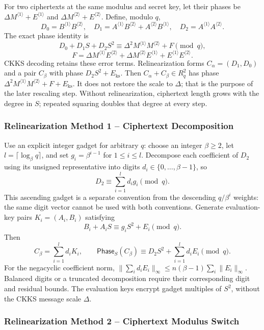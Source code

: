 For two ciphertexts at the same modulus and secret key, let their phases be $\Delta M^{\langle 1\rangle}+E^{\langle 1\rangle}$ and $\Delta M^{\langle 2\rangle}+E^{\langle 2\rangle}$. Define, modulo $q$,
\[
D_0=B^{\langle 1\rangle}B^{\langle 2\rangle},\quad
D_1=A^{\langle 1\rangle}B^{\langle 2\rangle}+A^{\langle 2\rangle}B^{\langle 1\rangle},\quad
D_2=A^{\langle 1\rangle}A^{\langle 2\rangle}.
\]
The exact phase identity is
\[
D_0+D_1S+D_2S^2\equiv\Delta^2M^{\langle 1\rangle}M^{\langle 2\rangle}+F\pmod q,
\]
\[
F=\Delta M^{\langle 1\rangle}E^{\langle 2\rangle}
+\Delta M^{\langle 2\rangle}E^{\langle 1\rangle}
+E^{\langle 1\rangle}E^{\langle 2\rangle}.
\]
CKKS decoding retains these error terms. Relinearization forms $C_\alpha=(D_1,D_0)$ and a pair $C_\beta$ with phase $D_2S^2+E_{\mathrm{ks}}$. Then $C_\alpha+C_\beta\in R_q^2$ has phase $\Delta^2M^{\langle 1\rangle}M^{\langle 2\rangle}+F+E_{\mathrm{ks}}$. It does not restore the scale to $\Delta$; that is the purpose of the later rescaling step. Without relinearization, ciphertext length grows with the degree in $S$; repeated squaring doubles that degree at every step.

\subsubsection{Relinearization  Method 1 -- Ciphertext Decomposition}
\label{subsubsec:relinearization-gadget-decomposition}

Use an explicit integer gadget for arbitrary $q$: choose an integer $\beta\geq 2$, let $l=\lceil\log_\beta q\rceil$, and set $g_i=\beta^{i-1}$ for $1\leq i\leq l$. Decompose each coefficient of $D_2$ using its unsigned representative into digits $d_i\in\{0,\ldots,\beta-1\}$, so
\[
D_2\equiv\sum_{i=1}^l d_i g_i\pmod q.
\]
This ascending gadget is a separate convention from the descending $q/\beta^i$ weights: the same digit vector cannot be used with both conventions. Generate evaluation-key pairs $K_i=(A_i,B_i)$ satisfying
\[
B_i+A_iS\equiv g_iS^2+E_i\pmod q.
\]
Then
\[
C_\beta=\sum_{i=1}^l d_iK_i,\qquad
\mathsf{Phase}_S(C_\beta)\equiv D_2S^2+\sum_{i=1}^l d_iE_i\pmod q.
\]
For the negacyclic coefficient norm, $\|\sum_i d_iE_i\|_\infty\leq n(\beta-1)\sum_i\|E_i\|_\infty$. Balanced digits or a truncated decomposition require their corresponding digit and residual bounds. The evaluation keys encrypt gadget multiples of $S^2$, without the CKKS message scale $\Delta$.

\subsubsection{Relinearization Method 2 -- Ciphertext Modulus Switch}
\label{subsubsec:relinearization-modulus-switch}

